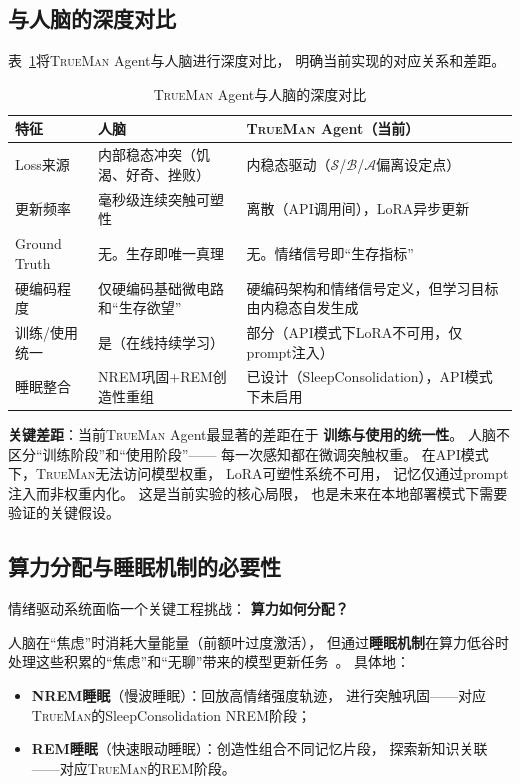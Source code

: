 \documentclass[11pt,a4paper]{article}
\newcommand{\TrueMan}{\textsc{TrueMan}}
\newcommand{\surprise}{\mathcal{S}}
\newcommand{\boredom}{\mathcal{B}}
\newcommand{\anxiety}{\mathcal{A}}
\begin{document}
\subsection{与人脑的深度对比}

表~\ref{tab:brain_comparison}将\TrueMan{} Agent与人脑进行深度对比，
明确当前实现的对应关系和差距。

\begin{table}[htbp]
\centering
\caption{\TrueMan{} Agent与人脑的深度对比}
\label{tab:brain_comparison}
\begin{tabular}{p{2.5cm}p{4.5cm}p{5.5cm}}
\toprule
特征 & 人脑 & \TrueMan{} Agent（当前） \\
\midrule
Loss来源 & 内部稳态冲突（饥渴、好奇、挫败） & 内稳态驱动（$\surprise$/$\boredom$/$\anxiety$偏离设定点） \\
更新频率 & 毫秒级连续突触可塑性 & 离散（API调用间），LoRA异步更新 \\
Ground Truth & 无。生存即唯一真理 & 无。情绪信号即``生存指标'' \\
硬编码程度 & 仅硬编码基础微电路和``生存欲望'' & 硬编码架构和情绪信号定义，但学习目标由内稳态自发生成 \\
训练/使用统一 & 是（在线持续学习） & 部分（API模式下LoRA不可用，仅prompt注入） \\
睡眠整合 & NREM巩固+REM创造性重组 & 已设计（SleepConsolidation），API模式下未启用 \\
\bottomrule
\end{tabular}
\end{table}

\textbf{关键差距}：当前\TrueMan{} Agent最显著的差距在于
\textbf{训练与使用的统一性}。
人脑不区分``训练阶段''和``使用阶段''——
每一次感知都在微调突触权重。
在API模式下，\TrueMan{}无法访问模型权重，
LoRA可塑性系统不可用，
记忆仅通过prompt注入而非权重内化。
这是当前实验的核心局限，
也是未来在本地部署模式下需要验证的关键假设。

\subsection{算力分配与睡眠机制的必要性}

情绪驱动系统面临一个关键工程挑战：
\textbf{算力如何分配？}

人脑在``焦虑''时消耗大量能量（前额叶过度激活），
但通过\textbf{睡眠机制}在算力低谷时处理这些积累的``焦虑''和``无聊''带来的模型更新任务~\cite{krishnan2019sleep}。
具体地：
\begin{itemize}[leftmargin=2em]
    \item \textbf{NREM睡眠}（慢波睡眠）：回放高情绪强度轨迹，
    进行突触巩固——对应\TrueMan{}的SleepConsolidation NREM阶段；
    \item \textbf{REM睡眠}（快速眼动睡眠）：创造性组合不同记忆片段，
    探索新知识关联——对应\TrueMan{}的REM阶段。
\end{itemize}
\end{document}
